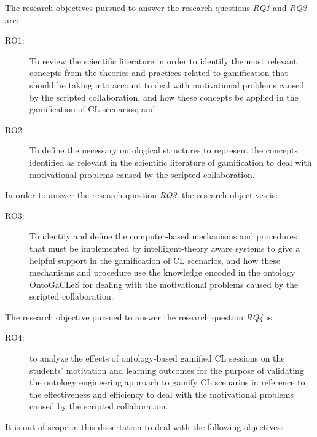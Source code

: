 The research objectives pursued to answer the research questions \emph{RQ1} and \emph{RQ2} are:

\begin{description}
\item[RO1:]
To review the scientific literature in order to identify the most relevant concepts from the theories and practices related to gamification that should be taking into account to deal with motivational problems caused by the scripted collaboration, and how these concepts be applied in the gamification of CL scenarios; and

\item[RO2:]
To define the necessary ontological structures to represent the concepts identified as relevant in the scientific literature of gamification to deal with motivational problems caused by the scripted collaboration.
\end{description}


In order to answer the research question \emph{RQ3}, the research objectives is:

\begin{description}
\item[RO3:]
To identify and define the computer-based mechanisms and procedures that must be implemented by intelligent-theory aware systems to give a helpful support in the gamification of CL scenarios, and how these mechanisms and procedure use the knowledge encoded in the ontology OntoGaCLeS for dealing with the motivational problems caused by the scripted collaboration.
\end{description}

The research objective pursued to answer the research question \emph{RQ4} is:

\begin{description}
\item[RO4:]
to analyze the effects of ontology-based gamified CL sessions on the students’ motivation and learning outcomes for the purpose of validating the ontology engineering approach to gamify CL scenarios in reference to the effectiveness and efficiency to deal with the motivational problems caused by the scripted collaboration.
\end{description}

It is out of scope in this dissertation to deal with the following objectives:

